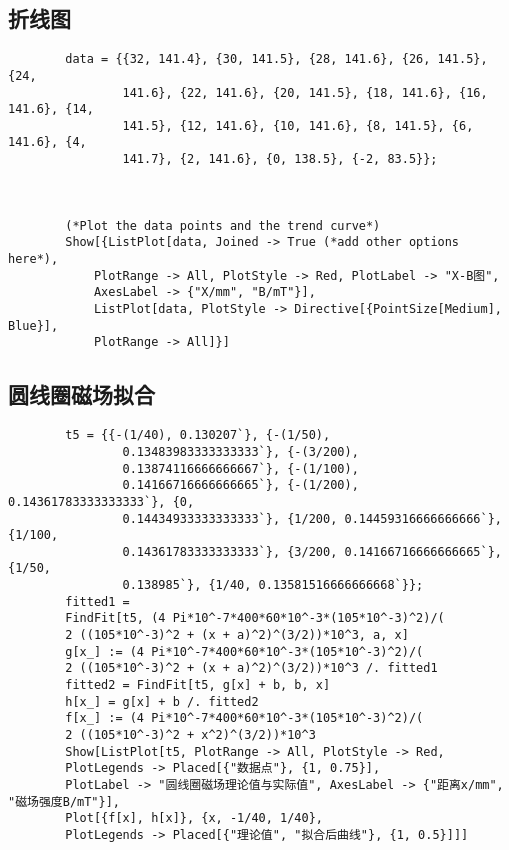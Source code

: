 \documentclass[11pt]{article}
\begin{document}
	\subsection{折线图}
	\begin{lstlisting}
		data = {{32, 141.4}, {30, 141.5}, {28, 141.6}, {26, 141.5}, {24, 
				141.6}, {22, 141.6}, {20, 141.5}, {18, 141.6}, {16, 141.6}, {14, 
				141.5}, {12, 141.6}, {10, 141.6}, {8, 141.5}, {6, 141.6}, {4, 
				141.7}, {2, 141.6}, {0, 138.5}, {-2, 83.5}};
		
		
		
		(*Plot the data points and the trend curve*)
		Show[{ListPlot[data, Joined -> True (*add other options here*), 
			PlotRange -> All, PlotStyle -> Red, PlotLabel -> "X-B图", 
			AxesLabel -> {"X/mm", "B/mT"}], 
			ListPlot[data, PlotStyle -> Directive[{PointSize[Medium], Blue}], 
			PlotRange -> All]}]
	\end{lstlisting}
	
	\subsection{圆线圈磁场拟合}
	\begin{lstlisting}
		t5 = {{-(1/40), 0.130207`}, {-(1/50), 
				0.13483983333333333`}, {-(3/200), 
				0.13874116666666667`}, {-(1/100), 
				0.14166716666666665`}, {-(1/200), 0.14361783333333333`}, {0, 
				0.14434933333333333`}, {1/200, 0.14459316666666666`}, {1/100, 
				0.14361783333333333`}, {3/200, 0.14166716666666665`}, {1/50, 
				0.138985`}, {1/40, 0.13581516666666668`}};
		fitted1 = 
		FindFit[t5, (4 Pi*10^-7*400*60*10^-3*(105*10^-3)^2)/(
		2 ((105*10^-3)^2 + (x + a)^2)^(3/2))*10^3, a, x]
		g[x_] := (4 Pi*10^-7*400*60*10^-3*(105*10^-3)^2)/(
		2 ((105*10^-3)^2 + (x + a)^2)^(3/2))*10^3 /. fitted1
		fitted2 = FindFit[t5, g[x] + b, b, x]
		h[x_] = g[x] + b /. fitted2
		f[x_] := (4 Pi*10^-7*400*60*10^-3*(105*10^-3)^2)/(
		2 ((105*10^-3)^2 + x^2)^(3/2))*10^3
		Show[ListPlot[t5, PlotRange -> All, PlotStyle -> Red, 
		PlotLegends -> Placed[{"数据点"}, {1, 0.75}], 
		PlotLabel -> "圆线圈磁场理论值与实际值", AxesLabel -> {"距离x/mm", "磁场强度B/mT"}], 
		Plot[{f[x], h[x]}, {x, -1/40, 1/40}, 
		PlotLegends -> Placed[{"理论值", "拟合后曲线"}, {1, 0.5}]]]
	\end{lstlisting}
	
\end{document}
